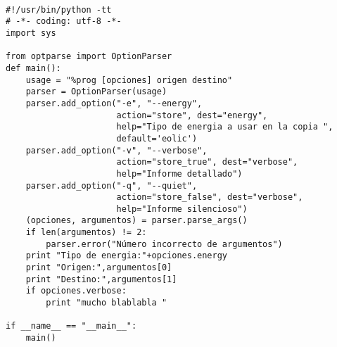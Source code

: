 \documentclass[ucs]{beamer}
\begin{document}
\begin{frame}[fragile]

  \begin{tiny}
  \begin{verbatim}

#!/usr/bin/python -tt
# -*- coding: utf-8 -*-
import sys

from optparse import OptionParser
def main():
    usage = "%prog [opciones] origen destino"
    parser = OptionParser(usage)
    parser.add_option("-e", "--energy", 
                      action="store", dest="energy",
                      help="Tipo de energia a usar en la copia ", 
                      default='eolic')
    parser.add_option("-v", "--verbose",
                      action="store_true", dest="verbose",
                      help="Informe detallado")
    parser.add_option("-q", "--quiet",
                      action="store_false", dest="verbose",
                      help="Informe silencioso")
    (opciones, argumentos) = parser.parse_args()
    if len(argumentos) != 2:
        parser.error("Número incorrecto de argumentos")
    print "Tipo de energia:"+opciones.energy
    print "Origen:",argumentos[0]
    print "Destino:",argumentos[1]
    if opciones.verbose:
        print "mucho blablabla " 

if __name__ == "__main__":
    main()
  \end{verbatim}
  \end{tiny}

\end{frame}
\end{document}
